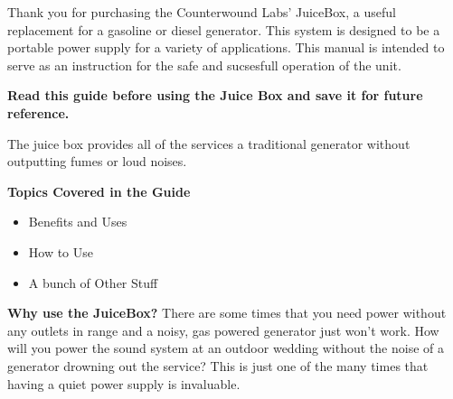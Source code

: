 \documentclass[../jb_user_manual.tex]{subfiles}
\begin{document}
\begin{flushleft}
\leftskip=3cm
Thank you for purchasing the Counterwound Labs' JuiceBox, a useful replacement for a gasoline or diesel generator. This system is designed to be a portable power supply for a variety of applications. This manual is intended to serve as an instruction for the safe and sucsesfull operation of the unit.

\vspace{2mm} 
\noindent 
\textbf{Read this guide before using the Juice Box and save it for future reference.}

\vspace{2mm}
The juice box provides all of the services a traditional generator without outputting fumes or loud noises.

\vspace{3mm}
\leftskip=0cm
\begin{Large}
	\textbf{Topics Covered in the Guide}
\end{Large}


\begin{itemize}
\setlength{\itemindent}{2.6cm}
	\item Benefits and Uses
	\item How to Use
	\item A bunch of Other Stuff
\end{itemize}

\hangindent=3cm 
\textbf{Why use the JuiceBox?} \break 
There are some times that you need power without any outlets in range and a noisy, gas powered generator just won't work. How will you power the sound system at an outdoor wedding without the noise of a generator drowning out the service? This is just one of the many times that having a quiet power supply is invaluable. 

\end{flushleft}
\end{document}
